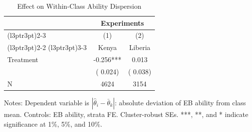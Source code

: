 \begin{table}[!h]
\centering
\caption{Effect on Within-Class Ability Dispersion}
\label{tab:dispersion}
\begin{threeparttable}
\begin{tabular}[t]{lcc}
\toprule
\multicolumn{1}{c}{ } & \multicolumn{2}{c}{Experiments} \\
\cmidrule(l{3pt}r{3pt}){2-3}
\multicolumn{1}{c}{ } & \multicolumn{1}{c}{(1)} & \multicolumn{1}{c}{(2)} \\
\cmidrule(l{3pt}r{3pt}){2-2} \cmidrule(l{3pt}r{3pt}){3-3}
 & \multicolumn{1}{c}{Kenya} & \multicolumn{1}{c}{Liberia} \\
\midrule
Treatment &  -0.256*** &   0.013 \\
 & (  0.024) & (  0.038) \\
\addlinespace
N & 4624 & 3154 \\
\bottomrule
\end{tabular}
\begin{tablenotes}[para]
\item Notes: Dependent variable is $|\hat{\theta}_i - \bar{\theta}_k|$: absolute deviation of EB ability from class mean. Controls: EB ability, strata FE. Cluster-robust SEs. ***, **, and * indicate significance at 1\%, 5\%, and 10\%.
\end{tablenotes}
\end{threeparttable}
\end{table}
